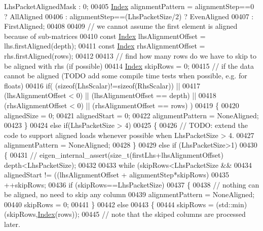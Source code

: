 \begin{DoxyCode}
{      LhsPacketAlignedMask : 0;
00405   \hyperlink{namespace_eigen_a62e77e0933482dafde8fe197d9a2cfde}{Index} alignmentPattern = alignmentStep==0 ? AllAligned
00406                            : alignmentStep==(LhsPacketSize/2) ? EvenAligned
00407                            : FirstAligned;
00408 
00409   \textcolor{comment}{// we cannot assume the first element is aligned because of sub-matrices}
00410   \textcolor{keyword}{const} \hyperlink{namespace_eigen_a62e77e0933482dafde8fe197d9a2cfde}{Index} lhsAlignmentOffset = lhs.firstAligned(depth);
00411   \textcolor{keyword}{const} \hyperlink{namespace_eigen_a62e77e0933482dafde8fe197d9a2cfde}{Index} rhsAlignmentOffset = rhs.firstAligned(rows);
00412 
00413   \textcolor{comment}{// find how many rows do we have to skip to be aligned with rhs (if possible)}
00414   \hyperlink{namespace_eigen_a62e77e0933482dafde8fe197d9a2cfde}{Index} skipRows = 0;
00415   \textcolor{comment}{// if the data cannot be aligned (TODO add some compile time tests when possible, e.g. for floats)}
00416   \textcolor{keywordflow}{if}( (\textcolor{keyword}{sizeof}(LhsScalar)!=\textcolor{keyword}{sizeof}(RhsScalar)) ||
00417       (lhsAlignmentOffset < 0) || (lhsAlignmentOffset == depth) ||
00418       (rhsAlignmentOffset < 0) || (rhsAlignmentOffset == rows) )
00419   \{
00420     alignedSize = 0;
00421     alignedStart = 0;
00422     alignmentPattern = NoneAligned;
00423   \}
00424   \textcolor{keywordflow}{else} \textcolor{keywordflow}{if}(LhsPacketSize > 4)
00425   \{
00426     \textcolor{comment}{// TODO: extend the code to support aligned loads whenever possible when LhsPacketSize > 4.}
00427     alignmentPattern = NoneAligned;
00428   \}
00429   \textcolor{keywordflow}{else} \textcolor{keywordflow}{if} (LhsPacketSize>1)
00430   \{
00431   \textcolor{comment}{//    eigen\_internal\_assert(size\_t(firstLhs+lhsAlignmentOffset)%
       depth<LhsPacketSize);}
00432 
00433     \textcolor{keywordflow}{while} (skipRows<LhsPacketSize &&
00434            alignedStart != ((lhsAlignmentOffset + alignmentStep*skipRows)%
00435       ++skipRows;
00436     \textcolor{keywordflow}{if} (skipRows==LhsPacketSize)
00437     \{
00438       \textcolor{comment}{// nothing can be aligned, no need to skip any column}
00439       alignmentPattern = NoneAligned;
00440       skipRows = 0;
00441     \}
00442     \textcolor{keywordflow}{else}
00443     \{
00444       skipRows = (std::min)(skipRows,\hyperlink{namespace_eigen_a62e77e0933482dafde8fe197d9a2cfde}{Index}(rows));
00445       \textcolor{comment}{// note that the skiped columns are processed later.}
}
\end{DoxyCode}
